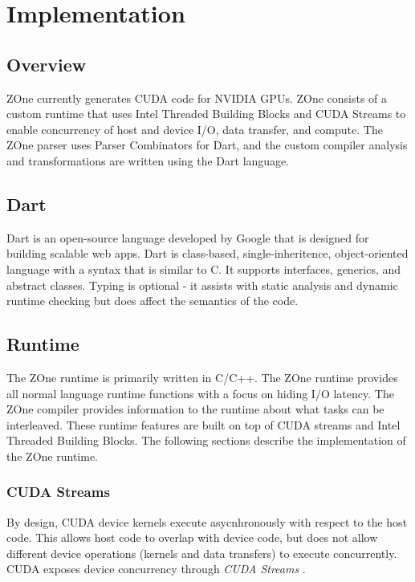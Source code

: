 \section*{Implementation}

\subsection*{Overview}

ZOne currently generates CUDA code for NVIDIA GPUs. ZOne consists of a custom
runtime that uses Intel Threaded Building Blocks and CUDA Streams to enable
concurrency of host and device I/O, data transfer, and compute. The ZOne parser
uses Parser Combinators for Dart\cite{dartParsers}, and the custom compiler
analysis and transformations are written using the Dart language.

\subsection*{Dart}
Dart is an open-source language developed by Google that is designed for
building scalable web apps. Dart is class-based, single-inheritence,
object-oriented language with a syntax that is similar to C. It supports
interfaces, generics, and abstract classes. Typing is optional - it assists
with static analysis and dynamic runtime checking but does affect the semantics
of the code.

\subsection*{Runtime}
The ZOne runtime is primarily written in C/C++. The ZOne runtime provides all
normal language runtime functions with a focus on hiding I/O latency. The ZOne
compiler provides information to the runtime about what tasks can be
interleaved. These runtime features are built on top of CUDA streams and 
Intel Threaded Building Blocks. The following sections describe the
implementation of the ZOne runtime.

\subsubsection*{CUDA Streams}
By design, CUDA device kernels execute asycnhronously with respect to the
host code. This allows host code to overlap with device code, but does not
allow different device operations (kernels and data transfers) to execute
concurrently. CUDA exposes device concurrency through \textit{CUDA Streams}
\cite{kirk2012programming}.

